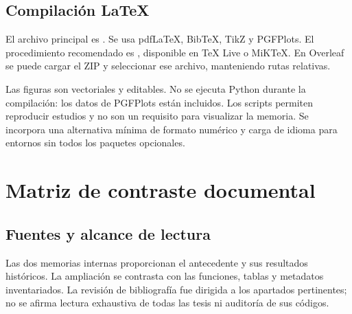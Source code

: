 \section{Compilación LaTeX}
El archivo principal es . Se usa pdfLaTeX, BibTeX, TikZ y PGFPlots. El procedimiento recomendado es , disponible en TeX Live o MiKTeX. En Overleaf se puede cargar el ZIP y seleccionar ese archivo, manteniendo rutas relativas.

Las figuras son vectoriales y editables. No se ejecuta Python durante la compilación: los datos de PGFPlots están incluidos. Los scripts permiten reproducir estudios y no son un requisito para visualizar la memoria. Se incorpora una alternativa mínima de formato numérico y carga de idioma para entornos sin todos los paquetes opcionales.

\chapter{Matriz de contraste documental}
\section{Fuentes y alcance de lectura}
Las dos memorias internas proporcionan el antecedente y sus resultados históricos. La ampliación se contrasta con las funciones, tablas y metadatos inventariados. La revisión de bibliografía fue dirigida a los apartados pertinentes; no se afirma lectura exhaustiva de todas las tesis ni auditoría de sus códigos.

